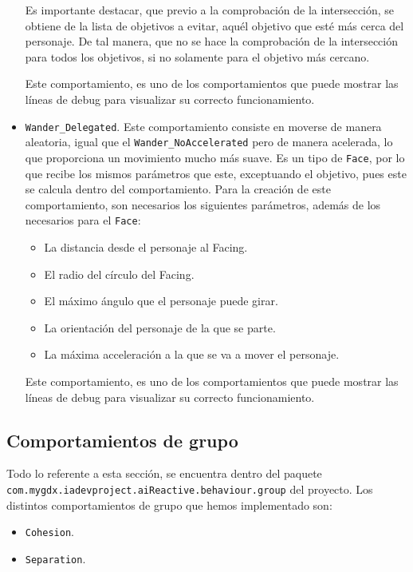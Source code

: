 \begin{itemize}
 Es importante destacar, que previo a la comprobación de la intersección, se obtiene de la lista de objetivos a evitar, aquél objetivo que esté más cerca del personaje. De tal manera, que no se hace la comprobación de la intersección para todos los objetivos, si no solamente para el objetivo más cercano. 
 
 Este comportamiento, es uno de los comportamientos que puede mostrar las líneas de debug para visualizar su correcto funcionamiento. 

 
 \item \texttt{Wander\_Delegated}. Este comportamiento consiste en moverse de manera aleatoria, igual que el \texttt{Wander\_NoAccelerated} pero de manera acelerada, lo que proporciona un movimiento mucho más suave. Es un tipo de \texttt{Face}, por lo que recibe los mismos parámetros que este, exceptuando el objetivo, pues este se calcula dentro del comportamiento. Para la creación de este comportamiento, son necesarios los siguientes parámetros, además de los necesarios para el \texttt{Face}:
 \begin{itemize}
  \item La distancia desde el personaje al Facing.
  \item El radio del círculo del Facing.
  \item El máximo ángulo que el personaje puede girar.
  \item La orientación del personaje de la que se parte.
  \item La máxima acceleración a la que se va a mover el personaje.
 \end{itemize}
 Este comportamiento, es uno de los comportamientos que puede mostrar las líneas de debug para visualizar su correcto funcionamiento. 

\end{itemize}




\medskip
\subsection{Comportamientos de grupo}
Todo lo referente a esta sección, se encuentra dentro del paquete \\ \texttt{com.mygdx.iadevproject.aiReactive.behaviour.group} del proyecto. Los distintos comportamientos de grupo que hemos implementado son:
\begin{itemize}
 \item \texttt{Cohesion}.
 \item \texttt{Separation}.
\end{itemize}

